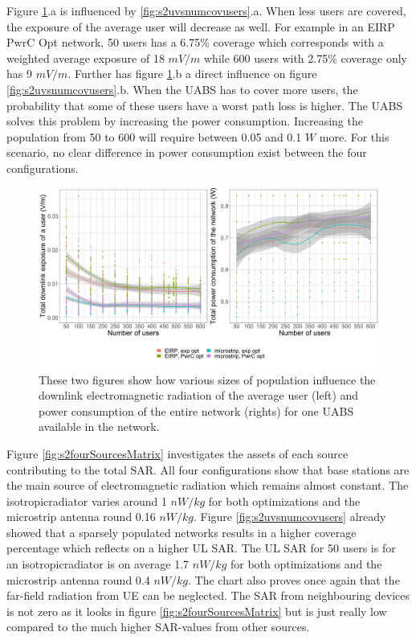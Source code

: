 Figure  \ref{fig:s2b_dlAndPc}.a  is influenced by  \ref{fig:s2uvsnumcovusers}.a. When less users are 
covered, the exposure of the average user will decrease as well.
For example in an EIRP \gls{PwrC Opt} network, 50 users has a 6.75\% coverage which corresponds with a weighted average exposure of  18 $mV/m$
while 600 users with 2.75\% coverage only has 9 $mV/m$.
Further has  figure \ref{fig:s2b_dlAndPc}.b a direct influence on figure \ref{fig:s2uvsnumcovusers}.b. When the \gls{UABS} has to cover more users,
the probability that some of these users have a worst path loss is higher. The \gls{UABS} solves this problem by increasing the 
power consumption. Increasing the population from 50 to 600 will require between 0.05 and 0.1 $W$ more. 
For this scenario, no clear difference in power consumption exist between the four configurations.

\begin{figure}[h!]
  \includegraphics[width=\textwidth]{../results/s2/uvsdlAndPc.png}
  \caption{These two figures show how various sizes of population influence the downlink electromagnetic radiation of the average user (left) and 
  power consumption of the entire network (rights) for one \acs{UABS} available in the network.}
  \label{fig:s2b_dlAndPc}
\end{figure}

Figure \ref{fig:s2fourSourcesMatrix} investigates the assets of each source contributing to the total \gls{SAR}. All four 
configurations show that base stations are the main source of electromagnetic radiation which remains almost constant.
The \gls{isotropicradiator} varies around 1 $nW/kg$ for both optimizations and the microstrip antenna round 0.16 $nW/kg$.
Figure \ref{fig:s2uvsnumcovusers} already 
showed that a sparsely populated networks results in a higher coverage percentage which reflects on a higher \gls{UL} \gls{SAR}. 
The \gls{UL} \gls{SAR} for 50 users is for an \gls{isotropicradiator} is on average 1.7 $nW/kg$ for both optimizations and the microstrip antenna round 0.4 $nW/kg$.
The chart also proves once again that the far-field radiation from \gls{UE} can be neglected. The \gls{SAR} from 
neighbouring devices is not zero as it looks in figure \ref{fig:s2fourSourcesMatrix} but is just really low compared to the much higher
\gls{SAR}-values from other sources.


